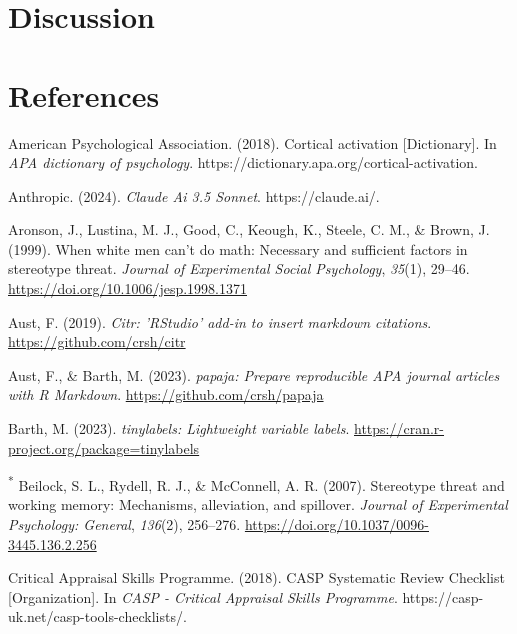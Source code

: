 \documentclass[
  stu,floatsintext]{apa7}
\newlength{\cslhangindent}
\newenvironment{CSLReferences}[2] %
 {\begin{list}{}{%
  \setlength{\itemindent}{0pt}
  \setlength{\leftmargin}{0pt}
  \setlength{\parsep}{0pt}
  \ifodd #1
   \setlength{\leftmargin}{\cslhangindent}
   \setlength{\itemindent}{-1\cslhangindent}
  \fi
  \setlength{\itemsep}{#2\baselineskip}}}
 {\end{list}}
\begin{document}
\section{Discussion}\label{discussion}

\newpage

\section{References}\label{references}

\label{refs}
\begin{CSLReferences}{1}{0}
American Psychological Association. (2018). Cortical activation {[}Dictionary{]}. In \emph{APA dictionary of psychology}. https://dictionary.apa.org/cortical-activation.

Anthropic. (2024). \emph{Claude {Ai} 3.5 {Sonnet}}. https://claude.ai/.

Aronson, J., Lustina, M. J., Good, C., Keough, K., Steele, C. M., \& Brown, J. (1999). When white men can't do math: {Necessary} and sufficient factors in stereotype threat. \emph{Journal of Experimental Social Psychology}, \emph{35}(1), 29--46. \url{https://doi.org/10.1006/jesp.1998.1371}

Aust, F. (2019). \emph{Citr: 'RStudio' add-in to insert markdown citations}. \url{https://github.com/crsh/citr}

Aust, F., \& Barth, M. (2023). \emph{{papaja}: {Prepare} reproducible {APA} journal articles with {R Markdown}}. \url{https://github.com/crsh/papaja}

Barth, M. (2023). \emph{{tinylabels}: Lightweight variable labels}. \url{https://cran.r-project.org/package=tinylabels}

\textsuperscript{*} Beilock, S. L., Rydell, R. J., \& McConnell, A. R. (2007). Stereotype threat and working memory: {Mechanisms}, alleviation, and spillover. \emph{Journal of Experimental Psychology: General}, \emph{136}(2), 256--276. \url{https://doi.org/10.1037/0096-3445.136.2.256}

Critical Appraisal Skills Programme. (2018). {CASP Systematic Review Checklist} {[}Organization{]}. In \emph{CASP - Critical Appraisal Skills Programme}. https://casp-uk.net/casp-tools-checklists/.


\end{CSLReferences}
\end{document}

